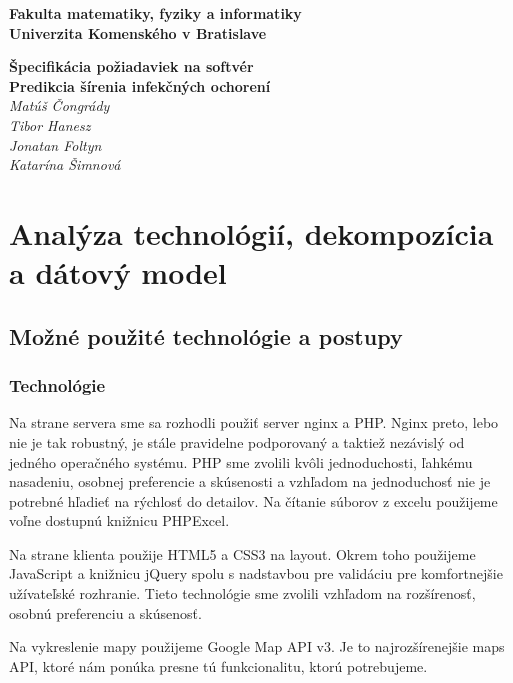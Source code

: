 \documentclass[12pt,a4paper]{report}
\begin{document}
\begin{titlepage}
\centering\bfseries
		Fakulta matematiky, fyziky a informatiky\\Univerzita Komenského v Bratislave	

	\fontsize{23}{28}\textbf{Špecifikácia požiadaviek na softvér}\\
	\fontsize{16}{22}\textbf{Predikcia šírenia infekčných ochorení}\\
	\large\textit{Matúš Čongrády\\Tibor Hanesz\\Jonatan Foltyn\\Katarína Šimnová}

\end{titlepage}\bigskip
	\setcounter{tocdepth}{9}
	\tableofcontents
	
\renewcommand{\chaptername}{}	
\chapter[Analýza technológií, dekompozícia a dátový model]{\rmfamily\bfseries
	Analýza technológií, dekompozícia a dátový model}
	

\section[Možné použité technológie a postupy]{\rmfamily\bfseries
	Možné použité technológie a postupy}

\subsection[Technológie]{\rmfamily\bfseries
	Technológie}
Na strane servera sme sa rozhodli použiť server nginx a PHP. Nginx preto, lebo nie je tak robustný, je stále pravidelne podporovaný a taktiež nezávislý od jedného operačného systému. PHP sme zvolili kvôli jednoduchosti, ľahkému nasadeniu, osobnej preferencie a skúsenosti a vzhľadom na jednoduchosť nie je potrebné hľadieť na rýchlosť do detailov. Na čítanie súborov z excelu použijeme voľne dostupnú knižnicu PHPExcel.
\par
Na strane klienta použije HTML5 a CSS3 na layout. Okrem toho použijeme JavaScript a knižnicu jQuery spolu s nadstavbou pre validáciu pre komfortnejšie užívateľské rozhranie. Tieto technológie sme zvolili vzhľadom na rozšírenosť, osobnú preferenciu a skúsenosť. 
\par
Na vykreslenie mapy použijeme Google Map API v3. Je to najrozšírenejšie maps API, ktoré nám ponúka presne tú funkcionalitu, ktorú potrebujeme.
\pagebreak
\end{document}
